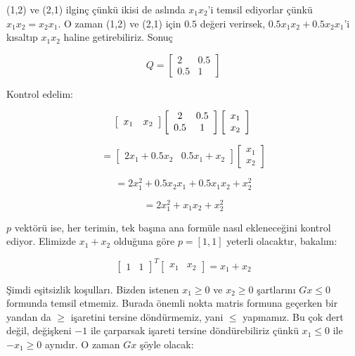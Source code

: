 \documentclass[12pt,fleqn]{article}\usepackage{../../common}
\begin{document}
(1,2) ve (2,1) ilginç çünkü ikisi de aslında $x_1x_2$'i temsil
ediyorlar çünkü $x_1x_2 = x_2x_1$. O zaman (1,2) ve (2,1) için $0.5$
değeri verirsek, $0.5x_1x_2 + 0.5x_2x_1$'i kısaltıp $x_1x_2$ haline
getirebiliriz. Sonuç

$$ 
Q = \left[ \begin{array}{cc}
2 & 0.5 \\ 0.5 & 1
\end{array} \right]
$$

Kontrol edelim:

$$ 
\left[ \begin{array}{cc}
 x_1 & x_2 
\end{array} \right]
\left[ \begin{array}{cc}
2 & 0.5 \\ 0.5 & 1
\end{array} \right]
\left[ \begin{array}{c}
x_1 \\  x_2 
\end{array} \right] \\
$$

$$ 
= \left[ 
\begin{array}{cc}
2x_1 + 0.5x_2 & 0.5x_1 + x_2 
\end{array} 
\right]
\left[ 
\begin{array}{c}
x_1 \\ x_2 
\end{array} 
\right] 
$$

$$ = 2x_1^2 + 0.5x_2x_1 + 0.5x_1x_2 + x_2^2  $$

$$ = 2x_1^2 + x_1x_2 + x_2^2  $$

$p$ vektörü ise, her terimin, tek başına ana formüle nasıl ekleneceğini kontrol
ediyor. Elimizde $x_1 + x_2$ olduğuna göre $p = [1, 1]$ yeterli olacaktır,
bakalım:

$$
\left[\begin{array}{cc}1&1\end{array}\right]^T
\left[\begin{array}{cc}x_1&x_2\end{array}\right] = x_1 + x_2
$$
 
Şimdi eşitsizlik koşulları. Bizden istenen $x_1 \geq 0$ ve $x_2 \geq 0$
şartlarını $Gx \leq 0$ formunda temsil etmemiz. Burada önemli nokta matris
formuna geçerken bir yandan da $\geq$ işaretini tersine döndürmemiz, yani $\leq$
yapmamız. Bu çok dert değil, değişkeni $-1$ ile çarparsak işareti tersine
döndürebiliriz çünkü $x_1 \leq 0$ ile $-x_1 \geq 0$ aynıdır. O zaman $Gx$ şöyle
olacak:
\end{document}
